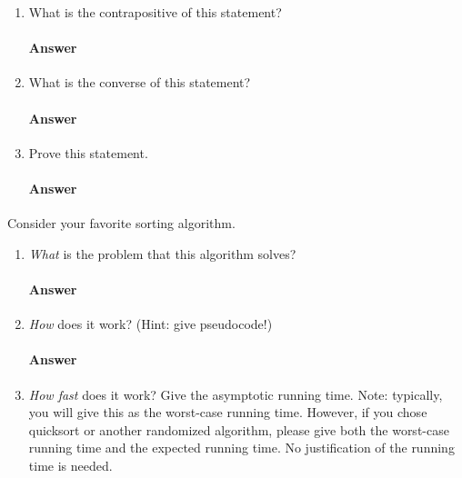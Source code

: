 \documentclass{article}
\begin{document}
{\begin{enumerate}
    \item What is the contrapositive of this statement?

        \paragraph{Answer}
        \todo{}

    \item What is the converse of this statement?

        \paragraph{Answer}
        \todo{}

    \item Prove this statement.

        \paragraph{Answer}
        \todo{}

\end{enumerate}



\collab{\todo{}}
Consider your favorite sorting algorithm.
\begin{enumerate}
    \item \emph{What} is the problem that this algorithm solves?

        \paragraph{Answer}
        \todo{}

    \item \emph{How} does it work? (Hint: give pseudocode!)

        \paragraph{Answer}
        \todo{}

    \item \emph{How fast} does it work?  Give the asymptotic running time.
        Note: typically, you will give this as the worst-case running time.
        However, if you chose quicksort or another randomized algorithm, please
        give both the worst-case running time and the expected running time.  No
        justification of the running time is needed.


\end{enumerate}}
\end{document}
